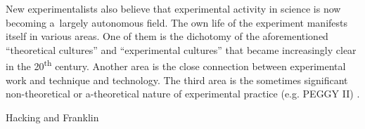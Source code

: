 New experimentalists also believe that experimental activity in science is now becoming a~largely autonomous field. The own life of the experiment manifests itself in various areas. One of them is the dichotomy of the aforementioned ``theoretical cultures'' and ``experimental cultures'' that became increasingly clear in the 20\textsuperscript{th} century. Another area is the close connection between experimental work and technique and technology. The third area is the sometimes significant non-theoretical or a-theoretical nature of experimental practice (e.g. PEGGY II) 
\parencite[][pp.161–170]{leplin_experimentation_1984}.%




Hacking 
\parencite*[][]{churchland_we_1985} %
 and Franklin 
\parencite*[][pp.226–243]{franklin_neglect_1986} %
